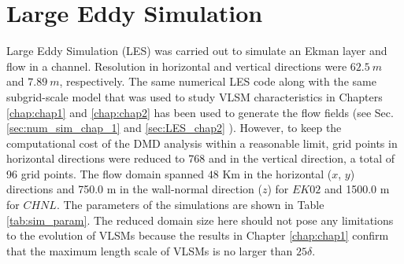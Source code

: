 \section{Large Eddy Simulation}
Large Eddy Simulation (LES) was carried out to simulate an Ekman layer and flow in a channel. Resolution in horizontal and vertical directions were $62.5\ m$ and $7.89\ m$, respectively. The same numerical LES code along with the same subgrid-scale model that was used to study VLSM characteristics in Chapters \ref{chap:chap1} and \ref{chap:chap2} has been used to generate the flow fields (see Sec. \ref{sec:num_sim_chap_1} and \ref{sec:LES_chap2} ). However, to keep the computational cost of the DMD analysis within a reasonable limit, grid points in horizontal directions were reduced to 768 and in the vertical direction, a total of 96 grid points. The flow domain spanned $48$ Km in the horizontal ($x$, $y$) directions and 750.0 m in the wall-normal direction ($z$) for $EK02$ and 1500.0 m for $CHNL$. The parameters of the simulations are shown in Table \ref{tab:sim_param}. The reduced domain size here should not pose any limitations to the evolution of VLSMs because the results in Chapter \ref{chap:chap1} confirm that the maximum length scale of VLSMs is no larger than $25\delta$.



